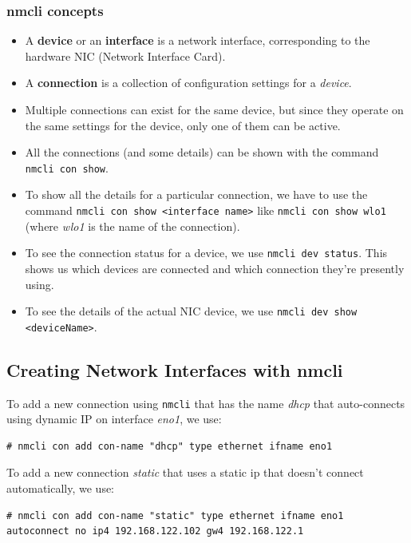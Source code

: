 \subsubsection{nmcli concepts}
\begin{itemize}
	\item A \textbf{device} or an \textbf{interface} is a network interface, corresponding to the hardware NIC (Network Interface Card). 
	\item A \textbf{connection} is a collection of configuration settings for a \textit{device}. 
	\item Multiple connections can exist for the same device, but since they operate on the same settings for the device, only one of them can be active. 
	\item All the connections (and some details) can be shown with the command \verb|nmcli con show|. 
	\item To show all the details for a particular connection, we have to use the command \verb|nmcli con show <interface name>| like \verb|nmcli con show wlo1| (where \textit{wlo1} is the name of the connection).
	\item To see the connection status for a device, we use \verb|nmcli dev status|. This shows us which devices are connected and which connection they're presently using. 
	\item To see the details of the actual NIC device, we use \verb|nmcli dev show <deviceName>|.
\end{itemize}

\subsection{Creating Network Interfaces with nmcli}
\vspace{-10pt}
To add a new connection using \verb|nmcli| that has the name \textit{dhcp} that auto-connects using dynamic IP on interface \textit{eno1}, we use:

\vspace{-15pt}
\begin{verbatim}
# nmcli con add con-name "dhcp" type ethernet ifname eno1 
\end{verbatim}
\vspace{-10pt}	

\noindent
To add a new connection \textit{static} that uses a static ip that doesn't connect automatically, we use:

\vspace{-15pt}
\begin{verbatim}
# nmcli con add con-name "static" type ethernet ifname eno1 autoconnect no ip4 192.168.122.102 gw4 192.168.122.1
\end{verbatim}
\vspace{-10pt}	

